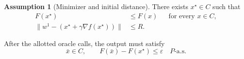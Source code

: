 \documentclass[10pt]{article}
\theoremstyle{definition}
\newtheorem{assumption}{Assumption}
\begin{document}
\begin{assumption}[Minimizer and initial distance]
There exists $x^\star\in C$ such that
\[
\begin{aligned}
F(x^\star)&\leq F(x) &&\text{for every }x\in C,\\
\|w^1-(x^\star+\gamma\nabla f(x^\star))\|&\leq R.
\end{aligned}
\]
\end{assumption}

After the allotted oracle calls, the output must satisfy
\[
\bar{x}\in C,\qquad F(\bar{x})-F(x^\star)\leq\varepsilon
\quad P\text{-a.s.}
\]
\end{document}
